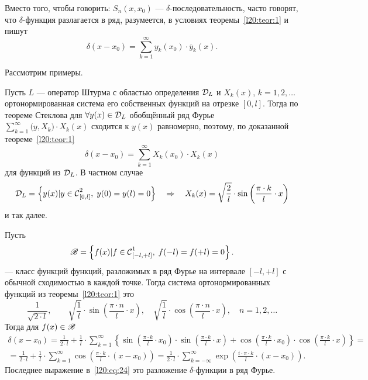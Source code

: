 Вместо того, чтобы говорить: $S_n(x,x_0)$ --- $\delta$-последовательность, часто говорят, что $\delta$-функция разлагается в ряд, разумеется, в условиях теоремы~\ref{l20:teor:1} и пишут 
\begin{equation}\label{l20:eq:22}
	\delta(x-x_0)=\sum\limits_{k=1}^{\infty}y_k(x_0)\cdot\overline{y}_k(x).
\end{equation}

\noindent Рассмотрим примеры.
\begin{enumerateD}
	\item Пусть $L$ --- оператор Штурма с областью определения $\mc{D}_L$ и $X_k(x)$, $k=1,2,\ldots$ ортонормированная система его собственных функций на отрезке $[0,l]$. Тогда по теореме Стеклова для $\forall y(x)\in\mc{D}_L$ обобщённый ряд Фурье $\displaystyle\sum\limits_{k=1}^{\infty}\big(y,X_k\big)\cdot X_k(x)$ сходится к $y(x)$ равномерно, поэтому, по доказанной теореме~\ref{l20:teor:1}
	\begin{equation}\label{l20:eq:23}
		\delta(x-x_0)=\sum\limits_{k=1}^{\infty}X_k(x_0)\cdot X_k(x)
	\end{equation}
	для функций из $\mc{D}_L$. В частном случае
	\begin{equation*}
		\mc{D}_L=\left\{y(x)|y\in\Cfn[{[0,l]}]{2},\;y(0)=y(l)=0\right\}\quad\Rightarrow\quad X_k(x)=\sqrt{\frac{2}{l}}\cdot\sin\left(\frac{\pi\cdot k}{
			l}\cdot x\right)
	\end{equation*}
	и так далее.
	\item Пусть
	\begin{equation*}
		\ms{B}=\left\{f(x)|f\in\Cfn[{[-l,+l]}]{1},\;f(-l)=f(+l)=0\right\}.
	\end{equation*}
	 --- класс функций функций, разложимых в ряд Фурье на интервале $[-l,+l]$ с обычной сходимостью в каждой точке. Тогда система ортонормированных функций из теоремы~\ref{l20:teor:1} это 
	\begin{equation*}
		\frac{1}{\sqrt{2\cdot l}},\qquad\sqrt{\frac{1}{l}}\cdot\sin\left(\frac{\pi\cdot n}{l}\cdot x\right),\quad\sqrt{\frac{1}{l}}\cdot\cos\left(\frac{\pi\cdot n}{l}\cdot x\right),\quad n=1,2,\ldots
	\end{equation*}
	Тогда для $f(x)\in\ms{B}$
	\begin{multline}\label{l20:eq:24}
		\delta(x-x_0)=\frac{1}{2\cdot l}+\frac{1}{l}\cdot\sum\limits_{k=1}^{\infty}\left\{\sin\left(\frac{\pi\cdot k}{l}\cdot x_0\right)\cdot\sin\left(\frac{\pi\cdot k}{l}\cdot x\right)+\cos\left(\frac{\pi\cdot k}{l}\cdot x_0\right)\cdot\cos\left(\frac{\pi\cdot k}{l}\cdot x\right)\right\}=\\
		=\frac{1}{2\cdot l}+\frac{1}{l}\cdot\sum\limits_{k=1}^{\infty}\cos\left(\frac{\pi\cdot k}{l}\cdot (x-x_0)\right)=\frac{1}{2\cdot l}\cdot\sum\limits_{k=-\infty}^{\infty}\exp\left(\frac{i\cdot\pi\cdot k}{l}\cdot (x-x_0)\right).
	\end{multline}
	Последнее выражение в~\eqref{l20:eq:24} это разложение $\delta$-функции в ряд Фурье.
\end{enumerateD}

